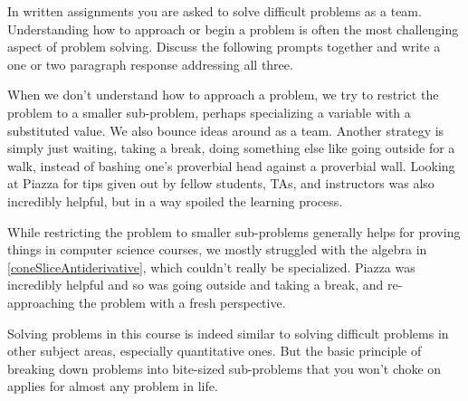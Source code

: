 \documentclass{exam}
\begin{document}
\begin{questions}

\question In written assignments you are asked to solve difficult problems as a team. 
Understanding how to approach or begin a problem is often the most
challenging aspect of problem solving. 
Discuss the following prompts together and
write a one or two paragraph response addressing all three.


\begin{solution}
    When we don't understand how to approach a problem, we try to restrict the problem to a smaller sub-problem, perhaps specializing a variable with a substituted value. We also bounce ideas around as a team. Another strategy is simply just waiting, taking a break, doing something else like going outside for a walk, instead of bashing one's proverbial head against a proverbial wall. Looking at Piazza for tips given out by fellow students, TAs, and instructors was also incredibly helpful, but in a way spoiled the learning process.

    While restricting the problem to smaller sub-problems generally helps for proving things in computer science courses, we mostly struggled with the algebra in \ref{coneSliceAntiderivative}, which couldn't really be specialized. Piazza was incredibly helpful and so was going outside and taking a break, and re-approaching the problem with a fresh perspective.

    Solving problems in this course is indeed similar to solving difficult problems in other subject areas, especially quantitative ones. But the basic principle of breaking down problems into bite-sized sub-problems that you won't choke on applies for almost any problem in life.
\end{solution}

\end{questions}
\end{document}
